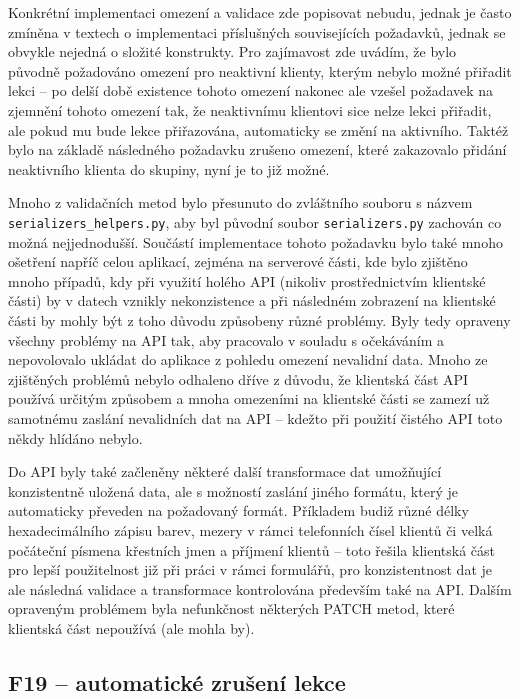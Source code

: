 Konkrétní implementaci omezení a validace zde popisovat nebudu, jednak je často zmíněna v textech o implementaci příslušných souvisejících požadavků, jednak se obvykle nejedná o složité konstrukty. Pro zajímavost zde uvádím, že bylo původně požadováno omezení pro neaktivní klienty, kterým nebylo možné přiřadit lekci -- po delší době existence tohoto omezení nakonec ale vzešel požadavek na zjemnění tohoto omezení tak, že neaktivnímu klientovi sice nelze lekci přiřadit, ale pokud mu bude lekce přiřazována, automaticky se změní na aktivního. Taktéž bylo na základě následného požadavku zrušeno omezení, které zakazovalo přidání neaktivního klienta do skupiny, nyní je to již možné.

Mnoho z validačních metod bylo přesunuto do zvláštního souboru s názvem \verb|serializers_helpers.py|, aby byl původní soubor \verb|serializers.py| zachován co možná nejjednodušší. Součástí implementace tohoto požadavku bylo také mnoho ošetření napříč celou aplikací, zejména na serverové části, kde bylo zjištěno mnoho případů, kdy při využití holého API (nikoliv prostřednictvím klientské části) by v datech vznikly nekonzistence a při následném zobrazení na klientské části by mohly být z toho důvodu způsobeny různé problémy. Byly tedy opraveny všechny problémy na API tak, aby pracovalo v souladu s očekáváním a nepovolovalo ukládat do aplikace z pohledu omezení nevalidní data. Mnoho ze zjištěných problémů nebylo odhaleno dříve z důvodu, že klientská část API používá určitým způsobem a mnoha omezeními na klientské části se zamezí už samotnému zaslání nevalidních dat na API -- kdežto při použití čistého API toto někdy hlídáno nebylo.

Do API byly také začleněny některé další transformace dat umožňující konzistentně uložená data, ale s možností zaslání jiného formátu, který je automaticky převeden na požadovaný formát. Příkladem budiž různé délky hexadecimálního zápisu barev, mezery v rámci telefonních čísel klientů či velká počáteční písmena křestních jmen a příjmení klientů -- toto řešila klientská část pro lepší použitelnost již při práci v rámci formulářů, pro konzistentnost dat je ale následná validace a transformace kontrolována především také na API. Dalším opraveným problémem byla nefunkčnost některých PATCH metod, které klientská část nepoužívá (ale mohla by).

\subsection{F19 -- automatické zrušení lekce}


